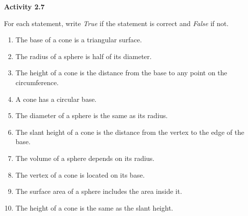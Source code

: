 
\vspace{0.75ex}
\noindent\textbf{Activity 2.7}


For each statement, write \emph{True} if the statement is correct and \emph{False} if not.
\begin{enumerate}[noitemsep, label = \color{blue}\arabic*. ]
    \item The base of a cone is a triangular surface. 
    \item The radius of a sphere is half of its diameter. 
    \item The height of a cone is the distance from the base to any point on the circumference. 
    \item A cone has a circular base. 
    \item The diameter of a sphere is the same as its radius. 
    \item The slant height of a cone is the distance from the vertex to the edge of the base. 
    \item The volume of a sphere depends on its radius. 
    \item The vertex of a cone is located on its base. 
    \item The surface area of a sphere includes the area inside it. 
    \item The height of a cone is the same as the slant height. 
\end{enumerate}

